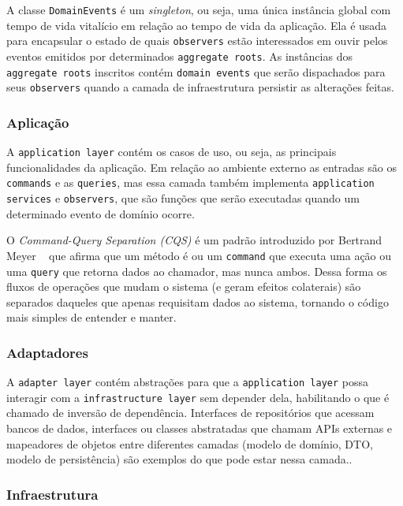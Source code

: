 A classe \texttt{DomainEvents} é um \emph{singleton}, ou seja, uma única instância global com tempo de vida vitalício em relação ao tempo de vida da aplicação. Ela é usada para encapsular o estado de quais \texttt{observers} estão interessados em ouvir pelos eventos emitidos por determinados \texttt{aggregate roots}. As instâncias dos \texttt{aggregate roots} inscritos contém \texttt{domain events} que serão dispachados para seus \texttt{observers} quando a camada de infraestrutura persistir as alterações feitas.

\subsubsection{Aplicação}

A \texttt{application layer} contém os casos de uso, ou seja, as principais funcionalidades da aplicação. Em relação ao ambiente externo as entradas são os \texttt{commands} e as \texttt{queries}, mas essa camada também implementa \texttt{application services} e \texttt{observers}, que são funções que serão executadas quando um determinado evento de domínio ocorre.

O \emph{Command-Query Separation (CQS)} é um padrão introduzido por Bertrand Meyer ~\cite{object-oriented-software-construction} que afirma que um método é ou um \texttt{command} que executa uma ação ou uma \texttt{query} que retorna dados ao chamador, mas nunca ambos. Dessa forma os fluxos de operações que mudam o sistema (e geram efeitos colaterais) são separados daqueles que apenas requisitam dados ao sistema, tornando o código mais simples de entender e manter.

\subsubsection{Adaptadores}

A \texttt{adapter layer} contém abstrações para que a \texttt{application layer} possa interagir com a \texttt{infrastructure layer} sem depender dela, habilitando o que é chamado de inversão de dependência. Interfaces de repositórios que acessam bancos de dados, interfaces ou classes abstratadas que chamam APIs externas e mapeadores de objetos entre diferentes camadas (modelo de domínio, DTO, modelo de persistência) são exemplos do que pode estar nessa camada..

\subsubsection{Infraestrutura}

